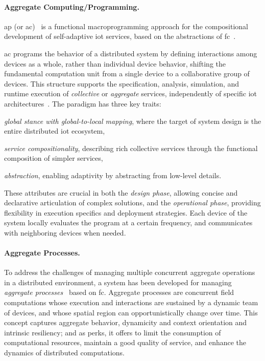 \documentclass[12pt, a4paper]{article}
\newenvironment{inlinelist}{\begin{enumerate*}[label=\emph{(\roman*)}]}{\end{enumerate*}}
\begin{document}
\sloppypar
\paragraph{Aggregate Computing/Programming.}
\ac{ap} (or \ac{ac})~\cite{CASADEI2019252} is a functional macroprogramming approach for the compositional development
of self-adaptive \ac{iot} services,
based on the abstractions of \ac{fc}~\cite{MAMEIZL04}.

\ac{ac} programs the behavior of a distributed system by defining interactions among devices as a whole,
rather than individual device behavior,
shifting the fundamental computation unit from a single device to a collaborative group of devices.
%
This structure supports the specification, analysis, simulation,
and runtime execution of \emph{collective} or \emph{aggregate} services,
independently of specific \ac{iot} architectures~\cite{FI2020-pulverization}.
%
The paradigm has three key traits:
\begin{inlinelist}
    \item \emph{global stance with global-to-local mapping}, where the target of system design is the entire distributed \ac{iot} ecosystem,
    \item \emph{service compositionality}, describing rich collective services through the functional composition of simpler services,
    \item \emph{abstraction}, enabling adaptivity by abstracting from low-level details.
\end{inlinelist}
%
These attributes are crucial in both the \emph{design phase},
allowing concise and declarative articulation of complex solutions,
and the \emph{operational phase},
providing flexibility in execution specifics and deployment strategies.
%
Each device of the system locally evaluates the program at a certain frequency,
and communicates with neighboring devices when needed.

\sloppypar
\paragraph{Aggregate Processes.}

To address the challenges of managing multiple concurrent aggregate operations in a distributed environment,
a system has been developed for managing \emph{aggregate processes}~\cite{aggregate-processes} based on \ac{fc}.
%
Aggregate processes are concurrent field computations
whose execution and interactions are sustained by a dynamic team of devices,
and whose spatial region can opportunistically change over time.
%
This concept captures aggregate behavior, dynamicity and context orientation and intrinsic resiliency;
and as perks, it offers to limit the consumption of computational resources,
maintain a good quality of service,
and enhance the dynamics of distributed computations.
\end{document}
